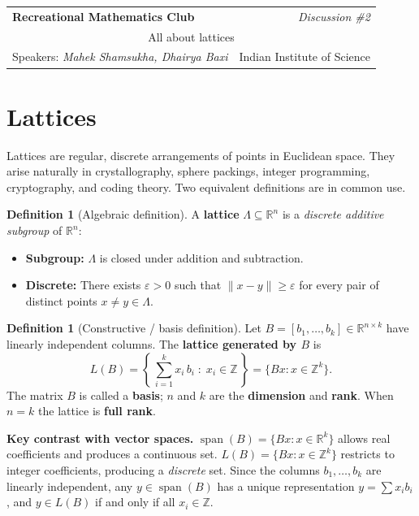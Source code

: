 \documentclass[11pt]{article}
\theoremstyle{plain}
\theoremstyle{definition}
\newtheorem{definition}[theorem]{Definition}
\newcommand{\Z}{\mathbb{Z}}
\newcommand{\R}{\mathbb{R}}
\begin{document}
\noindent
\begin{tabular}{|p{} r|}
\hline
\textbf{Recreational Mathematics Club} & \textit{Discussion \#2} \\[4pt]
\multicolumn{2}{|c|}{\Large All about lattices} \\[4pt]
Speakers: \textit{Mahek Shamsukha, Dhairya Baxi} & Indian Institute of Science \\
\hline
\end{tabular}


\section{Lattices}

Lattices are regular, discrete arrangements of points in Euclidean space. They arise naturally in crystallography, sphere packings, integer programming, cryptography, and coding theory. Two equivalent definitions are in common use.

\begin{definition}[Algebraic definition]
A \textbf{lattice} $\Lambda \subseteq \R^n$ is a \emph{discrete additive subgroup} of $\R^n$:
\begin{itemize}
  \item \textbf{Subgroup:} $\Lambda$ is closed under addition and subtraction.
  \item \textbf{Discrete:} There exists $\varepsilon > 0$ such that $\|x - y\| \ge \varepsilon$ for every pair of distinct points $x \ne y \in \Lambda$.
\end{itemize}
\end{definition}

\begin{definition}[Constructive / basis definition]
Let $B = [b_1, \ldots, b_k] \in \R^{n \times k}$ have linearly independent columns.
The \textbf{lattice generated by $B$} is
\[
  L(B) = \left\{\,\sum_{i=1}^{k} x_i\,b_i \;:\; x_i \in \Z\,\right\} = \{Bx : x \in \Z^k\}.
\]
The matrix $B$ is called a \textbf{basis}; $n$ and $k$ are the \textbf{dimension} and \textbf{rank}.
When $n = k$ the lattice is \textbf{full rank}.
\end{definition}

\begin{keybox}
\textbf{Key contrast with vector spaces.}
$\operatorname{span}(B) = \{Bx : x \in \R^k\}$ allows real coefficients and produces a continuous set.
$L(B) = \{Bx : x \in \Z^k\}$ restricts to integer coefficients, producing a \emph{discrete} set.
Since the columns $b_1,\ldots,b_k$ are linearly independent, any $y \in \operatorname{span}(B)$ has a unique representation $y = \sum x_i b_i$, and $y \in L(B)$ if and only if all $x_i \in \Z$.
\end{keybox}
\end{document}
